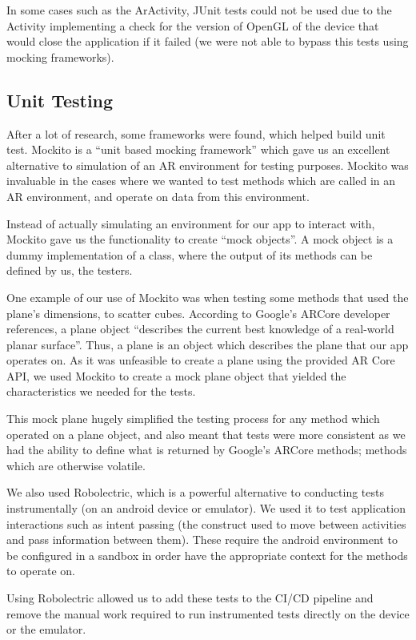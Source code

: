 \documentclass{l3proj}
\begin{document}
In some cases such as the ArActivity, JUnit tests could not be used due to the Activity
implementing a check for the version of OpenGL of the device that would close the
application if it failed (we were not able to bypass this tests using mocking frameworks).

\subsection{Unit Testing}
After a lot of research, some frameworks were found, which helped build unit test.
Mockito is a “unit based mocking framework”\cite{Mockito} which gave us an excellent alternative 
to simulation of an AR environment for testing purposes. Mockito was invaluable in 
the cases where we wanted to test methods which are called in an AR environment, 
and operate on data from this environment.

Instead of actually simulating an environment for our app to interact with, Mockito 
gave us the functionality to create “mock objects”. A mock object is a dummy 
implementation of a class, where the output of its methods can be defined by us, 
the testers.

One example of our use of Mockito was when testing some methods that used the plane's dimensions,
to scatter cubes. According to Google's ARCore developer references, a plane object “describes the 
current best knowledge of a real-world planar surface”\cite{Plane}. Thus, a plane is an object 
which describes the plane that our app operates on. As it was unfeasible to create a plane
using the provided AR Core API, we used Mockito to create a mock plane object
that yielded the characteristics we needed for the tests\cite{MockitoRerence}.

This mock plane hugely simplified the testing process for any method which 
operated on a plane object, and also meant that tests were more consistent as 
we had the ability to define what is returned by Google's ARCore methods; methods 
which are otherwise volatile.

We also used Robolectric, which is a powerful alternative to conducting tests instrumentally (on 
an android device or emulator)\cite{Roboelectric}. We used it to test application interactions
such as intent passing (the construct used to move between activities and pass 
information between them). These require the android environment to be configured in
a sandbox in order have the appropriate context for the methods to operate on.

Using Robolectric allowed us to add these tests to the CI/CD pipeline and remove
the manual work required to run instrumented tests directly on the device or the
emulator.
\end{document}
